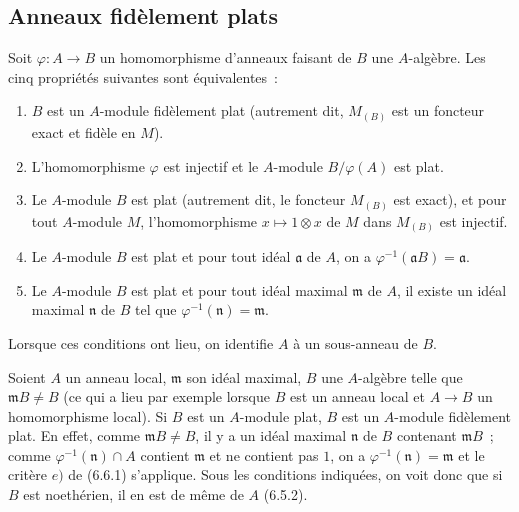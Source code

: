 \subsection{Anneaux fidèlement plats}
\label{subsection:0.6.6-fr}

\begin{env}[6.6.1]
\label{0.6.6.1-fr}
Soit $\varphi:A\to B$ un homomorphisme d'anneaux faisant de $B$ une
$A$-algèbre. Les cinq propriétés suivantes sont équivalentes~:
\begin{enumerate}
  \item[$a)$] $B$ est un $A$-module fidèlement plat (autrement dit,
    $M_{(B)}$ est un foncteur exact et fidèle en $M$).
  \item[$b)$] L'homomorphisme $\varphi$ est injectif et le $A$-module
    $B/\varphi(A)$ est plat.


  \item[$c)$] Le $A$-module $B$ est plat (autrement dit, le foncteur
    $M_{(B)}$ est exact), et pour tout $A$-module $M$, l'homomorphisme
    $x\mapsto1\otimes x$ de $M$ dans $M_{(B)}$ est injectif.
  \item[$d)$] Le $A$-module $B$ est plat et pour tout idéal $\mathfrak a$ de
    $A$, on a $\varphi^{-1}(\mathfrak aB)=\mathfrak a$.
  \item[$e)$] Le $A$-module $B$ est plat et pour tout idéal maximal
    $\mathfrak m$ de $A$, il existe un idéal maximal $\mathfrak n$ de $B$ tel
    que $\varphi^{-1}(\mathfrak n)=\mathfrak m$.
\end{enumerate}

Lorsque ces conditions ont lieu, on identifie $A$ à un sous-anneau de $B$.
\end{env}

\begin{env}[6.6.2]
\label{0.6.6.2-fr}
Soient $A$ un anneau local, $\mathfrak m$ son idéal maximal, $B$ une
$A$-algèbre telle que $\mathfrak mB\neq B$ (ce qui a lieu par exemple lorsque
$B$ est un anneau local et $A\to B$ un homomorphisme local). Si $B$ est un
$A$-module plat, $B$ est un $A$-module fidèlement plat. En effet, comme
$\mathfrak mB\neq B$, il y a un idéal maximal $\mathfrak n$ de $B$ contenant
$\mathfrak mB$~; comme $\varphi^{-1}(\mathfrak n)\cap A$ contient
$\mathfrak m$ et ne contient pas $1$, on a
$\varphi^{-1}(\mathfrak n)=\mathfrak m$ et le critère $e)$ de (6.6.1)
s'applique. Sous les conditions indiquées, on voit donc que si $B$ est
noethérien, il en est de même de $A$ (6.5.2).
\end{env}

